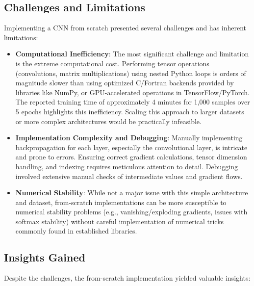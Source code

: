 \documentclass[conference]{IEEEtran}
\begin{document}
\subsection{Challenges and Limitations}
Implementing a CNN from scratch presented several challenges and has inherent limitations:

\begin{itemize}
    \item \textbf{Computational Inefficiency}: The most significant challenge and limitation is the extreme computational cost. Performing tensor operations (convolutions, matrix multiplications) using nested Python loops is orders of magnitude slower than using optimized C/Fortran backends provided by libraries like NumPy, or GPU-accelerated operations in TensorFlow/PyTorch. The reported training time of approximately 4 minutes for 1,000 samples over 5 epochs highlights this inefficiency. Scaling this approach to larger datasets or more complex architectures would be practically infeasible.
    \item \textbf{Implementation Complexity and Debugging}: Manually implementing backpropagation for each layer, especially the convolutional layer, is intricate and prone to errors. Ensuring correct gradient calculations, tensor dimension handling, and indexing requires meticulous attention to detail. Debugging involved extensive manual checks of intermediate values and gradient flows.
    \item \textbf{Numerical Stability}: While not a major issue with this simple architecture and dataset, from-scratch implementations can be more susceptible to numerical stability problems (e.g., vanishing/exploding gradients, issues with softmax stability) without careful implementation of numerical tricks commonly found in established libraries.
\end{itemize}

\subsection{Insights Gained}
Despite the challenges, the from-scratch implementation yielded valuable insights:
\end{document}

